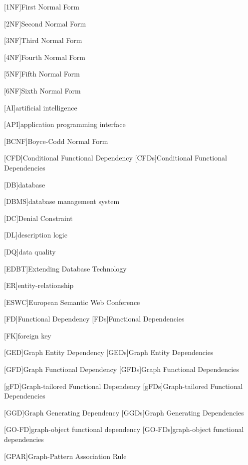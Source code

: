 \begin{acronym}

[1NF]{First Normal Form}

[2NF]{Second Normal Form}

[3NF]{Third Normal Form}

[4NF]{Fourth Normal Form}

[5NF]{Fifth Normal Form}

[6NF]{Sixth Normal Form}

[AI]{artificial intelligence}

[API]{application programming interface}

[BCNF]{Boyce-Codd Normal Form}

[CFD]{Conditional Functional Dependency}
[CFDs]{Conditional Functional Dependencies}

[DB]{database}

[DBMS]{database management system}

[DC]{Denial Constraint}

[DL]{description logic}

[DQ]{data quality}

[EDBT]{Extending Database Technology}

[ER]{entity-relationship}

[ESWC]{European Semantic Web Conference}

[FD]{Functional Dependency}
[FDs]{Functional Dependencies}

[FK]{foreign key}

[GED]{Graph Entity Dependency}
[GEDs]{Graph Entity Dependencies}


[GFD]{Graph Functional Dependency}
[GFDs]{Graph Functional Dependencies}

[gFD]{Graph-tailored Functional Dependency}
[gFDs]{Graph-tailored Functional Dependencies}

[GGD]{Graph Generating Dependency}
[GGDs]{Graph Generating Dependencies}

[GO-FD]{graph-object functional dependency}
[GO-FDs]{graph-object functional dependencies}

[GPAR]{Graph-Pattern Association Rule}


\end{acronym}
